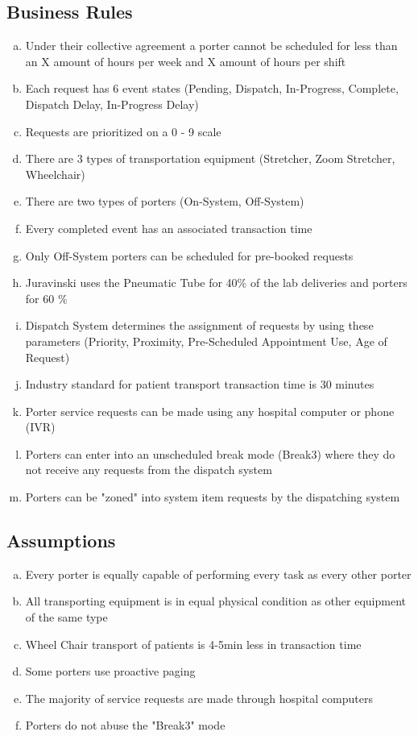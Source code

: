 \documentclass[paper=letter, fontsize=10pt]{scrartcl}
\numberwithin{equation}{section}		%
\numberwithin{figure}{section}			%
\numberwithin{table}{section}				%
\begin{document}
\subsection{Business Rules}
\begin{enumerate}[(a)]
	\item Under their collective agreement a porter cannot be scheduled for less than an X amount of hours per week and X amount of hours per shift 
	\item Each request has 6 event states (Pending, Dispatch, In-Progress, Complete, Dispatch Delay, In-Progress Delay)
	\item Requests are prioritized on a 0 - 9 scale
	\item There are 3 types of transportation equipment (Stretcher, Zoom Stretcher, Wheelchair)
	\item There are two types of porters (On-System, Off-System)
	\item Every completed event has an associated transaction time
	\item Only Off-System porters can be scheduled for pre-booked requests
	\item Juravinski uses the Pneumatic Tube for 40\% of the lab deliveries and porters for 60 \%
	\item Dispatch System determines the assignment of requests by using these parameters (Priority, Proximity, Pre-Scheduled Appointment Use, Age of Request) 
	\item Industry standard for patient transport transaction time is 30 minutes
	\item Porter service requests can be made using any hospital computer or phone (IVR)
	\item Porters can enter into an unscheduled break mode (Break3) where they do not receive any requests from the dispatch system
	\item Porters can be "zoned" into system item requests by the dispatching system  
\end{enumerate}	    
\subsection{Assumptions}
\begin{enumerate}[(a)]
	\item Every porter is equally capable of performing every task as every other porter
	\item All transporting equipment is in equal physical condition as other equipment of the same type
	\item Wheel Chair transport of patients is 4-5min less in transaction time
	\item Some porters use proactive paging  
	\item The majority of service requests are made through hospital computers
	\item Porters do not abuse the "Break3" mode
\end{enumerate}
\end{document}
